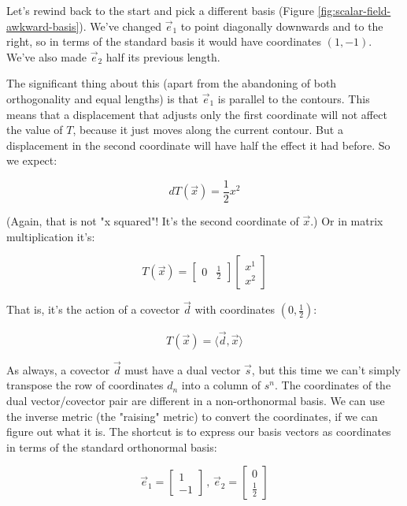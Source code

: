 Let's rewind back to the start and pick a different basis (Figure \ref{fig:scalar-field-awkward-basis}). We've changed $\vec{e}_1$ to point diagonally downwards and to the right, so in terms of the standard basis it would have coordinates $(1, -1)$. We've also made $\vec{e}_2$ half its previous length.

The significant thing about this (apart from the abandoning of both orthogonality and equal lengths) is that $\vec{e}_1$ is parallel to the contours. This means that a displacement that adjusts only the first coordinate will not affect the value of $T$, because it just moves along the current contour. But a displacement in the second coordinate will have half the effect it had before. So we expect:

\begin{equation}
    dT(\vec{x}) = \frac{1}{2}x^2
    \label{eqn:t-rel-awk}
\end{equation}

(Again, that is not "x squared"! It's the second coordinate of $\vec{x}$.) Or in matrix multiplication it's:

\begin{equation}
    T(\vec{x}) = 
    \begin{bmatrix}0 & \frac{1}{2}\end{bmatrix}
    \begin{bmatrix}x^1 \\ x^2\end{bmatrix}
    \label{eqn:t-rel-matrices-awk}
\end{equation}

That is, it's the action of a covector $\vec{d}$ with coordinates $(0, \frac{1}{2})$:

$$
T(\vec{x}) = \langle \vec{d}, \vec{x} \rangle
$$

As always, a covector $\vec{d}$ must have a dual vector $\vec{s}$, but this time we can't simply transpose the row of coordinates $d_n$ into a column of $s^n$. The coordinates of the dual vector/covector pair are different in a non-orthonormal basis. We can use the inverse metric (the "raising" metric) to convert the coordinates, if we can figure out what it is. The shortcut is to express our basis vectors as coordinates in terms of the standard orthonormal basis:

$$
\vec{e}_1 = \begin{bmatrix}
    1 \\
    -1
\end{bmatrix}
\, , \,
\vec{e}_2 = \begin{bmatrix}
    0 \\
    \frac{1}{2}
\end{bmatrix}
$$

